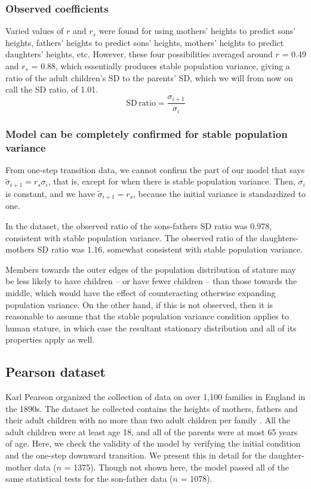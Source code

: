\documentclass[a4paper,11pt]{article} %
\begin{document}
\subsubsection*{Observed coefficients}
Varied values of $r$ and $r_s$ were found for using mothers' heights to predict sons' heights, fathers' heights to predict sons' heights, mothers' heights to predict daughters' heights, etc. However, these four possibilities averaged around $r$ = 0.49 and $r_s$ = 0.88, which essentially produces stable population variance, giving a ratio of the adult children's SD to the parents' SD, which we will from now on call the SD ratio, of 1.01.
$$\mathrm{SD} \, \mathrm{ratio} = \frac{\sigma_{i+1}}{\sigma_i}$$

\subsubsection*{Model can be completely confirmed for stable population variance}
From one-step transition data, we cannot confirm the part of our model that says $\tilde{\sigma}_{i+1} = r_s \sigma_i$, that is, except for when there is stable population variance. Then, $\sigma_i$ is constant, and we have $\tilde{\sigma}_{i+1} = r_s$, because the initial variance is standardized to one.

In the dataset, the observed ratio of the sons-fathers SD ratio was 0.978, consistent with stable population variance. The observed ratio of the daughters-mothers SD ratio was 1.16, somewhat consistent with stable population variance. 

Members towards the outer edges of the population distribution of stature may be less likely to have children -- or have fewer children -- than those towards the middle, which would have the effect of counteracting otherwise expanding population variance. On the other hand, if this is not observed, then it is reasonable to assume that the stable population variance condition applies to human stature, in which case the resultant stationary distribution and all of its properties apply as well. 



\subsection{Pearson dataset}

Karl Pearson organized the collection of data on over 1,100 families in England in the 1890s. The dataset he collected contains the heights of mothers, fathers and their adult children with no more than two adult children per family \cite{pearson}. All the adult children were at least age 18, and all of the parents were at most 65 years of age. Here, we check the validity of the model by verifying the initial condition and the one-step downward transition. We present this in detail for the daughter-mother data ($n$ = 1375). Though not shown here, the model passed all of the same statistical tests for the son-father data ($n$ = 1078).
\end{document}
